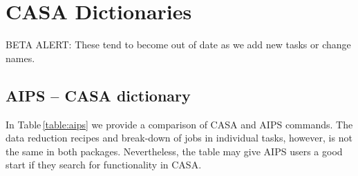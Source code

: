 

\chapter[Appendix: CASA Dictionaries]{CASA Dictionaries}
\label{chapter:dict}

{BETA ALERT:} These tend to become out of date as we add new tasks
or change names.

\section{AIPS -- CASA dictionary}
\label{section:dict.aips}

In Table\,\ref{table:aips} we provide a comparison of CASA and AIPS
commands. The data reduction recipes and break-down of jobs in
individual tasks, however, is not the same in both
packages. Nevertheless, the table may give AIPS users a good start if
they search for functionality in CASA. 

